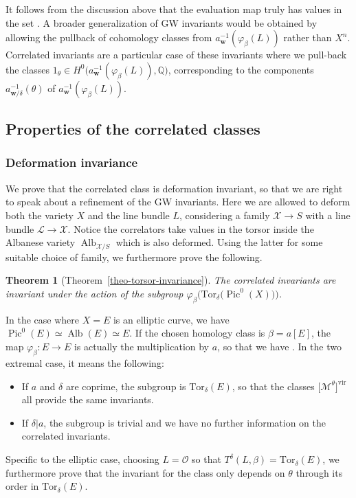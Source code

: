 \documentclass[pdftex]{sigma}
\newcommand{\Tor}{\mathrm{Tor}}
\newcommand{\vir}[1]{\big[#1\big]^\mathrm{vir}}
\newcommand{\Pic}{\operatorname{Pic}}
\newcommand{\Alb}{\operatorname{Alb}}
\newcommand{\QQ}{\mathbb{Q}}
\newcommand{\bfw}{ {\boldsymbol w} }
\renewcommand{\L}{\mathcal{L}}
\newcommand{\M}{\mathcal{M}}
\newcommand{\X}{\mathcal{X}}
\renewcommand{\O}{\mathcal{O}}
\numberwithin{equation}{section}
\newtheorem*{theom}{Theorem}
\theoremstyle{definition}
\begin{document}
It follows from the discussion above that the evaluation map truly has values in the set \smash{$a_\bfw^{-1}(\varphi_\beta(L))=\bigsqcup a_{\bfw/\delta}^{-1}(\theta)$}. A broader generalization of GW invariants would be obtained by allowing the pullback of cohomology classes from $a_\bfw^{-1}(\varphi_\beta(L))$ rather than $X^n$. Correlated invariants are a particular case of these invariants where we pull-back the classes $1_\theta\in H^0\bigl(a_\bfw^{-1}(\varphi_\beta(L)),\QQ\bigr)$, corresponding to the components $a_{\bfw/\delta}^{-1}(\theta)$ of $a_{\bfw}^{-1}(\varphi_\beta(L))$.


\subsection{Properties of the correlated classes}

\subsubsection{Deformation invariance}
 We prove that the correlated class is deformation invariant, so that we are right to speak about a refinement of the GW invariants. Here we are allowed to deform both the variety $X$ and the line bundle $L$, considering a family $\X\to S$ with a line bundle $\L\to\X$. Notice the correlators take values in the torsor inside the Albanese variety $\Alb_{\X/S}$ which is also deformed. Using the latter for some suitable choice of family, we furthermore prove the following.

\begin{theom}[Theorem~\ref{theo-torsor-invariance}]
 The correlated invariants \smash{$\langle\langle\gamma\rangle\rangle^\delta_{g,\beta,\bfw}$} are invariant under the action of the subgroup $\varphi_\beta\bigl(\Tor_\delta\bigl(\Pic^0(X)\bigr)\bigr)$.
\end{theom}

In the case where $X=E$ is an elliptic curve, we have $\Pic^0(E)\simeq\Alb(E)\simeq E$. If the chosen homology class is $\beta=a[E]$, the map $\varphi_\beta\colon E\to E$ is actually the multiplication by $a$, so that we have
\smash{$\varphi_{a[E]}(\Tor_\delta(E)) = \Tor_{\delta/\gcd(a,\delta)}(E)$}.
In the two extremal case, it means the following:
\begin{itemize}\itemsep=0pt
 \item If $a$ and $\delta$ are coprime, the subgroup is $\Tor_\delta(E)$, so that the classes $\vir{\M^\theta}$ all provide the same invariants.
 \item If $\delta|a$, the subgroup is trivial and we have no further information on the correlated invariants.
\end{itemize}
Specific to the elliptic case, choosing $L=\O$ so that $T^\delta(L,\beta)=\Tor_\delta(E)$, we furthermore prove that the invariant for the class \smash{$\vir{\M^\theta}$} only depends on $\theta$ through its order in $\Tor_\delta(E)$.
\end{document}
